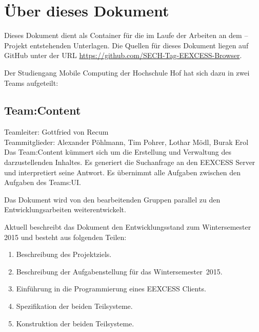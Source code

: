\chapter*{Über dieses Dokument}

Dieses Dokument dient als Container für die im Laufe der
Arbeiten an dem \SECH--Projekt entstehenden Unterlagen. Die
Quellen für dieses Dokument liegen auf GitHub unter der URL
\url{https://github.com/SECH-Tag-EEXCESS-Browser}.

Der Studiengang Mobile Computing der Hochschule Hof hat sich dazu in zwei Teams aufgeteilt:

\section*{Team:Content}\vspace{-1.5em}

Teamleiter: Gottfried von Recum\\
Teammitglieder: Alexander Pöhlmann, Tim Pohrer, Lothar Mödl, Burak Erol\\
Das Team:Content kümmert sich um die Erstellung und Verwaltung des darzustellenden Inhaltes. Es generiert die Suchanfrage an den EEXCESS Server und interpretiert seine Antwort. Es übernimmt alle Aufgaben zwischen den Aufgaben des Teams:UI.



Das Dokument wird von den bearbeitenden Gruppen parallel zu den
Entwicklungsarbeiten weiterentwickelt. 

Aktuell beschreibt das Dokument den Entwicklungsstand zum
Wintersemester 2015 und besteht aus folgenden Teilen:
\begin{enumerate}
     \item Beschreibung des Projektziels.
     \item Beschreibung der Aufgabenstellung für das Wintersemester~2015.
     \item Einführung in die Programmierung eines EEXCESS Clients.
     \item Spezifikation der beiden Teilsysteme.
     \item Konstruktion der beiden Teilsysteme.
\end{enumerate}


